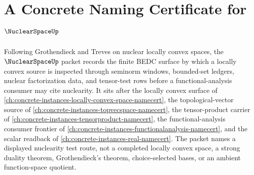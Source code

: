 \chapter{A Concrete Naming Certificate for $\NuclearSpaceUp$}
\label{ch:concrete-instances-nuclear-space-namecert}

Following Grothendieck and Treves on nuclear locally convex spaces, the $\NuclearSpaceUp$ packet records the finite BEDC surface by which a locally convex source is inspected through seminorm windows, bounded-set ledgers, nuclear factorization data, and tensor-test rows before a functional-analysis consumer may cite nuclearity. It sits after the locally convex surface of \autoref{ch:concrete-instances-locally-convex-space-namecert}, the topological-vector source of \autoref{ch:concrete-instances-topvecspace-namecert}, the tensor-product carrier of \autoref{ch:concrete-instances-tensorproduct-namecert}, the functional-analysis consumer frontier of \autoref{ch:concrete-instances-functionalanalysis-namecert}, and the scalar readback of \autoref{ch:concrete-instances-real-namecert}. The packet names a displayed nuclearity test route, not a completed locally convex space, a strong duality theorem, Grothendieck's theorem, choice-selected bases, or an ambient function-space quotient.


